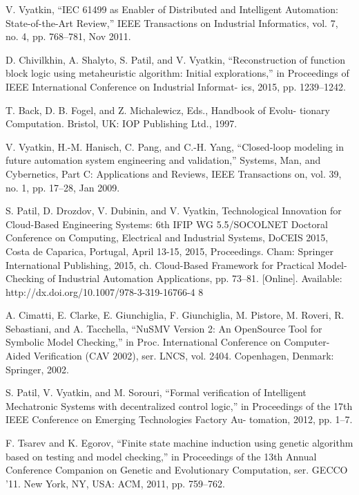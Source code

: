 \documentclass[14pt]{article}
\begin{document}
\pagebreak

\begin{thebibliography}{99}

V. Vyatkin, “IEC 61499 as Enabler of Distributed and Intelligent
Automation: State-of-the-Art Review,” IEEE Transactions on Industrial
Informatics, vol. 7, no. 4, pp. 768–781, Nov 2011.

D. Chivilkhin, A. Shalyto, S. Patil, and V. Vyatkin, “Reconstruction of
function block logic using metaheuristic algorithm: Initial explorations,”
in Proceedings of IEEE International Conference on Industrial Informat-
ics, 2015, pp. 1239–1242.

T. Back, D. B. Fogel, and Z. Michalewicz, Eds., Handbook of Evolu-
tionary Computation. Bristol, UK: IOP Publishing Ltd., 1997.

V. Vyatkin, H.-M. Hanisch, C. Pang, and C.-H. Yang, “Closed-loop
modeling in future automation system engineering and validation,”
Systems, Man, and Cybernetics, Part C: Applications and Reviews, IEEE
Transactions on, vol. 39, no. 1, pp. 17–28, Jan 2009.

S. Patil, D. Drozdov, V. Dubinin, and V. Vyatkin, Technological
Innovation for Cloud-Based Engineering Systems: 6th IFIP WG
5.5/SOCOLNET Doctoral Conference on Computing, Electrical and
Industrial Systems, DoCEIS 2015, Costa de Caparica, Portugal, April
13-15, 2015, Proceedings. Cham: Springer International Publishing,
2015, ch. Cloud-Based Framework for Practical Model-Checking of
Industrial Automation Applications, pp. 73–81. [Online]. Available:
http://dx.doi.org/10.1007/978-3-319-16766-4 8

A. Cimatti, E. Clarke, E. Giunchiglia, F. Giunchiglia, M. Pistore,
M. Roveri, R. Sebastiani, and A. Tacchella, “NuSMV Version 2: An
OpenSource Tool for Symbolic Model Checking,” in Proc. International
Conference on Computer-Aided Verification (CAV 2002), ser. LNCS, vol.
2404. Copenhagen, Denmark: Springer, 2002.

S. Patil, V. Vyatkin, and M. Sorouri, “Formal verification of Intelligent
Mechatronic Systems with decentralized control logic,” in Proceedings
of the 17th IEEE Conference on Emerging Technologies Factory Au-
tomation, 2012, pp. 1–7.

F. Tsarev and K. Egorov, “Finite state machine induction using genetic
algorithm based on testing and model checking,” in Proceedings of
the 13th Annual Conference Companion on Genetic and Evolutionary
Computation, ser. GECCO ’11. New York, NY, USA: ACM, 2011, pp.
759–762.


\end{thebibliography}
\end{document}
